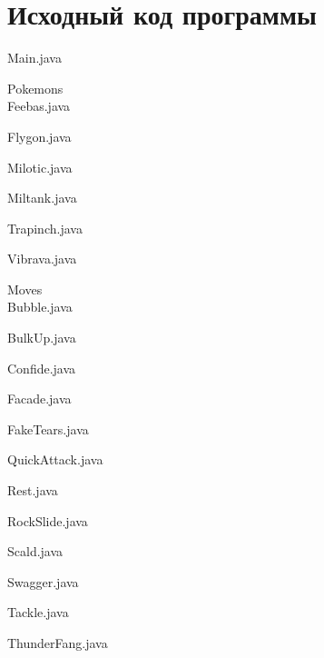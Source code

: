 \documentclass[12pt,onecolumn]{article}
\begin{document}
\section{Исходный код программы}
Main.java

Pokemons\\
Feebas.java

Flygon.java

Milotic.java

Miltank.java

Trapinch.java

Vibrava.java

Moves\\
Bubble.java

BulkUp.java

Confide.java

Facade.java

FakeTears.java

QuickAttack.java

Rest.java

RockSlide.java

Scald.java

Swagger.java

Tackle.java

ThunderFang.java

\end{document}
